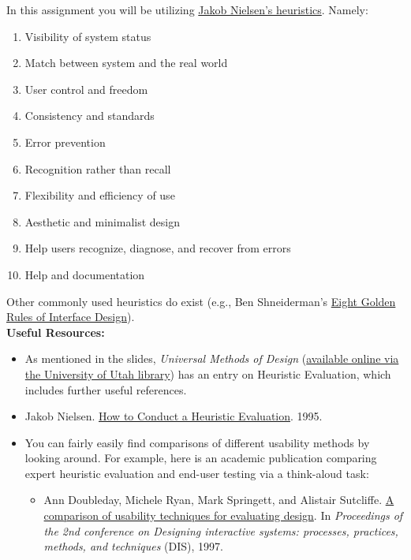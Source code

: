 \documentclass{article}
\begin{document}
In this assignment you will be utilizing \href{https://www.nngroup.com/articles/ten-usability-heuristics/}{Jakob Nielsen’s heuristics}. Namely:
\begin{enumerate}
    \item Visibility of system status
    \item Match between system and the real world
    \item User control and freedom
    \item Consistency and standards
    \item Error prevention
    \item Recognition rather than recall
    \item Flexibility and efficiency of use
    \item Aesthetic and minimalist design
    \item Help users recognize, diagnose, and recover from errors
    \item Help and documentation
\end{enumerate}
Other commonly used heuristics do exist (e.g., Ben Shneiderman’s \href{https://www.cs.umd.edu/users/ben/goldenrules.html}{Eight Golden Rules of Interface Design}).\\

\textbf{Useful Resources:}
\begin{itemize}
    \item As mentioned in the slides, \textit{Universal Methods of Design} (\href{https://utah-primoprod.hosted.exlibrisgroup.com/primo-explore/fulldisplay?docid=UUU_ALMA21274580350002001&context=L&vid=UTAH}{available online via the University of Utah library}) has an entry on Heuristic Evaluation, which includes further useful references.
    
    \item Jakob Nielsen. \href{https://www.nngroup.com/articles/how-to-conduct-a-heuristic-evaluation/}{How to Conduct a Heuristic Evaluation}. 1995. 

    \item You can fairly easily find comparisons of different usability methods by looking around. For example, here is an academic publication comparing expert heuristic evaluation and end-user testing via a think-aloud task: 
    \begin{itemize}
        \item Ann Doubleday, Michele Ryan, Mark Springett, and Alistair Sutcliffe. \href{https://dl.acm.org/citation.cfm?id=263583}{A comparison of usability techniques for evaluating design}. In \textit{Proceedings of the 2nd conference on Designing interactive systems: processes, practices, methods, and techniques} (DIS), 1997.
    \end{itemize}
\end{itemize}
\end{document}
